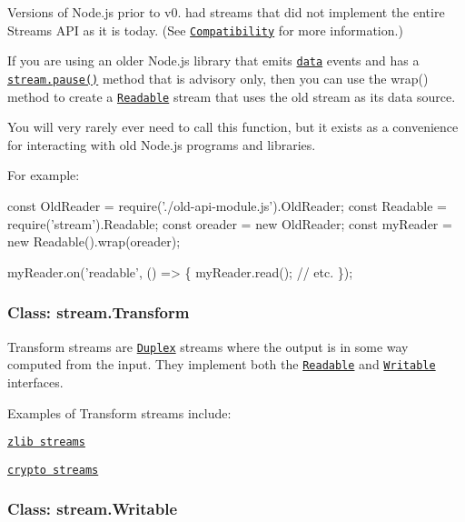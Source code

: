 Versions of Node.\+js prior to v0. had streams that did not implement the entire Streams A\+PI as it is today. (See \href{#stream_compatibility_with_older_node_js_versions}{\tt Compatibility} for more information.)

If you are using an older Node.\+js library that emits \href{#stream_event_data}{\tt {\ttfamily \textquotesingle{}data\textquotesingle{}}} events and has a \href{#stream_readable_pause}{\tt {\ttfamily stream.\+pause()}} method that is advisory only, then you can use the {\ttfamily wrap()} method to create a \href{#stream_class_stream_readable}{\tt Readable} stream that uses the old stream as its data source.

You will very rarely ever need to call this function, but it exists as a convenience for interacting with old Node.\+js programs and libraries.

For example\+:


\begin{DoxyCode}
const OldReader = require('./old-api-module.js').OldReader;
const Readable = require('stream').Readable;
const oreader = new OldReader;
const myReader = new Readable().wrap(oreader);

myReader.on('readable', () => \{
  myReader.read(); // etc.
\});
\end{DoxyCode}


\subsubsection*{Class\+: stream.\+Transform}

Transform streams are \href{#stream_class_stream_duplex}{\tt Duplex} streams where the output is in some way computed from the input. They implement both the \href{#stream_class_stream_readable}{\tt Readable} and \href{#stream_class_stream_writable}{\tt Writable} interfaces.

Examples of Transform streams include\+:


\begin{DoxyItemize}
\item \href{zlib.html}{\tt zlib streams}
\item \href{crypto.html}{\tt crypto streams}
\end{DoxyItemize}

\subsubsection*{Class\+: stream.\+Writable}


